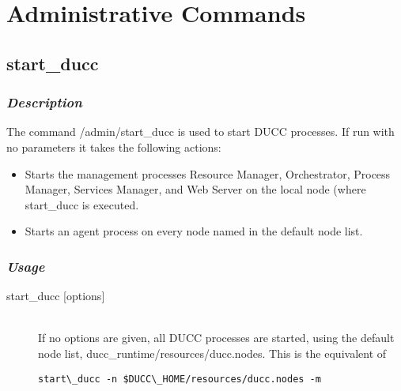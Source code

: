 
\section{Administrative Commands}

\subsection{start\_ducc}
\label{subsec:admin.start-ducc}

    \subsubsection{{\em Description}}
    The command \ducchome/admin/start\_ducc is used to start DUCC processes. If run with no parameters
    it takes the following actions:
    \begin{itemize}
      \item Starts the management processes Resource Manager, Orchestrator, Process Manager,      
      Services Manager, and Web Server on the local node (where start\_ducc is executed.       
      \item Starts an agent process on every node named in the default node list. 
    \end{itemize}

    \subsubsection{{\em Usage}}

    \begin{description}
      \item[start\_ducc {[options]}] \hfill \\ 
        If no options are given, all DUCC processes are started, using the default node list, 
        ducc\_runtime/resources/ducc.nodes. This is the equivalent of 
\begin{verbatim}
start\_ducc -n $DUCC\_HOME/resources/ducc.nodes -m 
\end{verbatim}
      \end{description}
      
